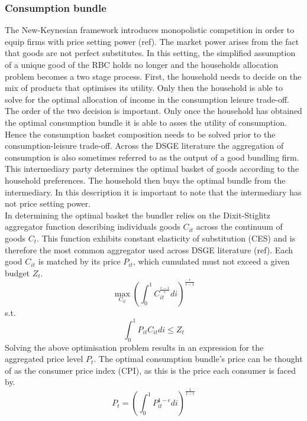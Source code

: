 \documentclass[12pt,a4paper,english]{article} %
\begin{document}
	\subsubsection{Consumption bundle}
	The New-Keynesian framework introduces monopolistic competition in order to equip firms with price setting power (ref). The market power arises from the fact that goods are not perfect substitutes. In this setting, the simplified assumption of a unique good of the RBC holds no longer and the households allocation problem becomes a two stage process. First, the household needs to decide on the mix of products that optimises its utility. Only then the household is able to solve for the optimal allocation of income in the consumption leisure trade-off. The order of the two decision is important. Only once the household has obtained the optimal consumption bundle it is able to asses the utility of consumption. Hence the consumption basket composition needs to be solved prior to the consumption-leisure trade-off. Across the DSGE literature the aggregation of consumption is also sometimes referred to as the output of a good bundling firm. This intermediary party determines the optimal basket of goods according to the household preferences. The household then buys the optimal bundle from the intermediary. In this description it is important to note that the intermediary has not price setting power.\\
	In determining the optimal basket the bundler relies on the Dixit-Stiglitz aggregator function describing individuals goods $C_{it}$ across the continuum of goods $C_t$. This function exhibits constant elasticity of substitution (CES) and is therefore the most common aggregator used across DSGE literature (ref). Each good $C_{it}$ is matched by its price $P_{it}$, which cumulated must not exceed a given budget $Z_t$.
	\[
		\max_{C_{it}} \left(
							\int_{0}^{1} C_{it}^{ \frac{\epsilon - 1}{\epsilon} } di 
					\right)^{ \frac{\epsilon}{\epsilon - 1} }
	\]
	s.t.
	\[
		\int_{0}^{1} P_{it} C_{it} di \leq Z_t
	\]
	Solving the above optimisation problem results in an expression for the aggregated price level $P_t$. The optimal consumption bundle's price can be thought of as the consumer price index (CPI), as this is the price each consumer is faced by.
	\begin{equation} \label{eq:1}
			P_t = \left(
						\int_{0}^{1} P_{it}^{ 1 - \epsilon } di 
					\right)^{ \frac{1}{1 - \epsilon} }
	\end{equation}
\end{document}
